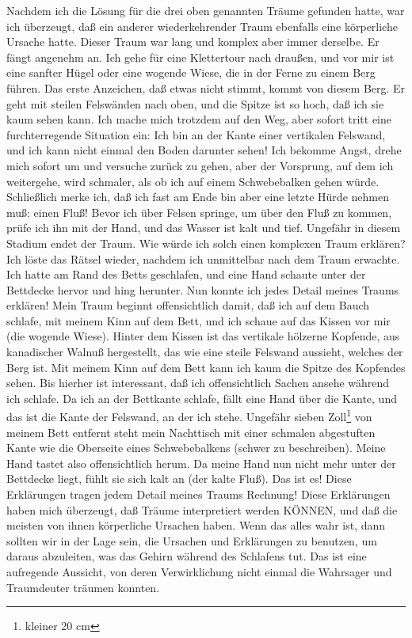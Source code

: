 Nachdem ich die Lösung für die drei oben genannten Träume gefunden hatte, war ich überzeugt, daß ein anderer wiederkehrender Traum ebenfalls eine körperliche Ursache hatte.
Dieser Traum war lang und komplex aber immer derselbe.
Er fängt angenehm an.
Ich gehe für eine Klettertour nach draußen, und vor mir ist eine sanfter Hügel oder eine wogende Wiese, die in der Ferne zu einem Berg führen.
Das erste Anzeichen, daß etwas nicht stimmt, kommt von diesem Berg.
Er geht mit steilen Felswänden nach oben, und die Spitze ist so hoch, daß ich sie kaum sehen kann.
Ich mache mich trotzdem auf den Weg, aber sofort tritt eine furchterregende Situation ein: Ich bin an der Kante einer vertikalen Felswand, und ich kann nicht einmal den Boden darunter sehen!
Ich bekomme Angst, drehe mich sofort um und versuche zurück zu gehen, aber der Vorsprung, auf dem ich weitergehe, wird schmaler, als ob ich auf einem Schwebebalken gehen würde.
Schließlich merke ich, daß ich fast am Ende bin aber eine letzte Hürde nehmen muß: einen Fluß!
Bevor ich über Felsen springe, um über den Fluß zu kommen, prüfe ich ihn mit der Hand, und das Wasser ist kalt und tief.
Ungefähr in diesem Stadium endet der Traum.
Wie würde ich solch einen komplexen Traum erklären?
Ich löste das Rätsel wieder, nachdem ich unmittelbar nach dem Traum erwachte.
Ich hatte am Rand des Betts geschlafen, und eine Hand schaute unter der Bettdecke hervor und hing herunter.
Nun konnte ich jedes Detail meines Traums erklären!
Mein Traum beginnt offensichtlich damit, daß ich auf dem Bauch schlafe, mit meinem Kinn auf dem Bett, und ich schaue auf das Kissen vor mir (die wogende Wiese).
Hinter dem Kissen ist das vertikale hölzerne Kopfende, aus kanadischer Walnuß hergestellt, das wie eine steile Felswand aussieht, welches der Berg ist.
Mit meinem Kinn auf dem Bett kann ich kaum die Spitze des Kopfendes sehen.
Bis hierher ist interessant, daß ich offensichtlich Sachen ansehe während ich schlafe.
Da ich an der Bettkante schlafe, fällt eine Hand über die Kante, und das ist die Kante der Felswand, an der ich stehe.
Ungefähr sieben Zoll\footnote{kleiner 20 cm} von meinem Bett entfernt steht mein Nachttisch mit einer schmalen abgestuften Kante wie die Oberseite eines Schwebebalkens (schwer zu beschreiben).
Meine Hand tastet also offensichtlich herum.
Da meine Hand nun nicht mehr unter der Bettdecke liegt, fühlt sie sich kalt an (der kalte Fluß). Das ist es!
Diese Erklärungen tragen jedem Detail meines Traums Rechnung!
Diese Erklärungen haben mich überzeugt, daß Träume interpretiert werden KÖNNEN, und daß die meisten von ihnen körperliche Ursachen haben.
Wenn das alles wahr ist, dann sollten wir in der Lage sein, die Ursachen und Erklärungen zu benutzen, um daraus abzuleiten, was das Gehirn während des Schlafens tut.
Das ist eine aufregende Aussicht, von deren Verwirklichung nicht einmal die Wahrsager und Traumdeuter träumen konnten.


